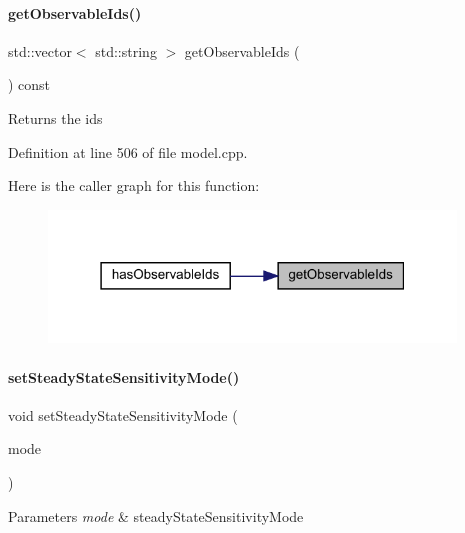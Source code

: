 \paragraph{\texorpdfstring{getObservableIds()}{getObservableIds()}}
{\footnotesize\ttfamily std\+::vector$<$ std\+::string $>$ get\+Observable\+Ids (\begin{DoxyParamCaption}{ }\end{DoxyParamCaption}) const\hspace{0.3cm}{\ttfamily [virtual]}}

\begin{DoxyReturn}{Returns}
the ids 
\end{DoxyReturn}


Definition at line 506 of file model.\+cpp.

Here is the caller graph for this function\+:
\nopagebreak
\begin{figure}[H]
\begin{center}
\leavevmode
\includegraphics[width=307pt]{classamici_1_1_model_a8d356757af0856dbdb6c45548f788377_icgraph}
\end{center}
\end{figure}
\mbox{\label{classamici_1_1_model_ab8e08cf804357e3ac070c11ac9b8ec35}} 
\paragraph{\texorpdfstring{setSteadyStateSensitivityMode()}{setSteadyStateSensitivityMode()}}
{\footnotesize\ttfamily void set\+Steady\+State\+Sensitivity\+Mode (\begin{DoxyParamCaption}\item[{const \mbox{\hyperlink{namespaceamici_a1f7d44f04185d57423d01d47d13470a6}{Steady\+State\+Sensitivity\+Mode}}}]{mode }\end{DoxyParamCaption})}


\begin{DoxyParams}{Parameters}
{\em mode} & steady\+State\+Sensitivity\+Mode \\
\hline
\end{DoxyParams}


